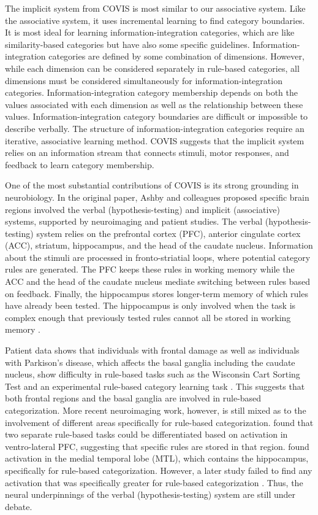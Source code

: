 \documentclass[../dissertation.tex]{subfiles}
\begin{document}
	The implicit system from COVIS is most similar to our associative system. Like the associative system, it uses incremental learning to find category boundaries. It is most ideal for learning information-integration categories, which are like similarity-based categories but have also some specific guidelines. Information-integration categories are defined by some combination of dimensions. However, while each dimension can be considered separately in rule-based categories, all dimensions must be considered simultaneously for information-integration categories. Information-integration category membership depends on both the values associated with each dimension as well as the relationship between these values. Information-integration category boundaries are difficult or impossible to describe verbally. The structure of information-integration categories require an iterative, associative learning method. COVIS suggests that the implicit system relies on an information stream that connects stimuli, motor responses, and feedback to learn category membership. \par
	One of the most substantial contributions of COVIS is its strong grounding in neurobiology. In the original paper, Ashby and colleagues proposed specific brain regions involved the verbal (hypothesis-testing) and implicit (associative) systems, supported by neuroimaging and patient studies. The verbal (hypothesis-testing) system relies on the prefrontal cortex (PFC), anterior cingulate cortex (ACC), striatum, hippocampus, and the head of the caudate nucleus. Information about the stimuli are processed in fronto-striatial loops, where potential category rules are generated. The PFC keeps these rules in working memory while the ACC and the head of the caudate nucleus mediate switching between rules based on feedback. Finally, the hippocampus stores longer-term memory of which rules have already been tested. The hippocampus is only involved when the task is complex enough that previously tested rules cannot all be stored in working memory \citep{Ashby2005,Ashby2011}. \par
	 Patient data shows that individuals with frontal damage as well as individuals with Parkison's disease, which affects the basal ganglia including the caudate nucleus, show difficulty in rule-based tasks such as the Wisconsin Cart Sorting Test \citep{Robinson1980} and an experimental rule-based category learning task \citep{Ashby2003b}. This suggests that both frontal regions and the basal ganglia are involved in rule-based categorization. More recent neuroimaging work, however, is still mixed as to the involvement of different areas specifically for rule-based categorization. \citet{Soto2013} found that two separate rule-based tasks could be differentiated based on activation in ventro-lateral PFC, suggesting that specific rules are stored in that region. \citet{Nomura2007} found activation in the medial temporal lobe (MTL), which contains the hippocampus, specifically for rule-based categorization. However, a later study failed to find any activation that was specifically greater for rule-based categorization \citep{Carpenter2016}. Thus, the neural underpinnings of the verbal (hypothesis-testing) system are still under debate. \par
\end{document}
